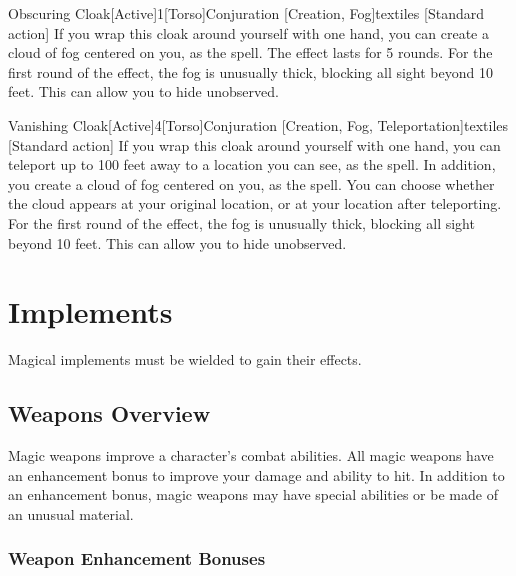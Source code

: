         \begin{magicitemdef}{Obscuring Cloak}[Active]{1}[Torso]{Conjuration [Creation, Fog]}{textiles}
            [Standard action] If you wrap this cloak around yourself with one hand, you can create a cloud of fog centered on you, as the  spell.
            The effect lasts for 5 rounds.
            For the first round of the effect, the fog is unusually thick, blocking all sight beyond 10 feet.
            This can allow you to hide unobserved.
        \end{magicitemdef}

        \begin{magicitemdef}{Vanishing Cloak}[Active]{4}[Torso]{Conjuration [Creation, Fog, Teleportation]}{textiles}
            [Standard action] If you wrap this cloak around yourself with one hand, you can teleport up to 100 feet away to a location you can see, as the  spell.
            In addition, you create a cloud of fog centered on you, as the  spell.
            You can choose whether the cloud appears at your original location, or at your location after teleporting.
            For the first round of the effect, the fog is unusually thick, blocking all sight beyond 10 feet.
            This can allow you to hide unobserved.
        \end{magicitemdef}

\section{Implements}
    Magical implements must be wielded to gain their effects.

    \subsection{Weapons Overview}

        Magic weapons improve a character's combat abilities.
        All magic weapons have an enhancement bonus to improve your damage and ability to hit.
        In addition to an enhancement bonus, magic weapons may have special abilities or be made of an unusual material.

        \subsubsection{Weapon Enhancement Bonuses}\label{Weapon Enhancement Bonuses}

